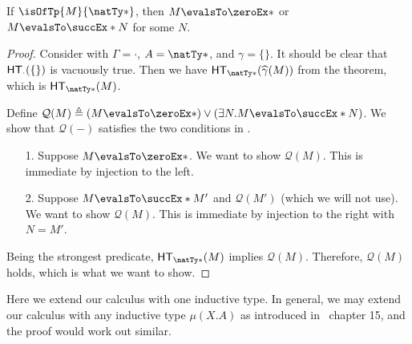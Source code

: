 \documentclass[letterpaper]{article}
\begin{document}
\begin{corollary}
  If $\isOfTp{M}{\natTy*}$, then $M \evalsTo \zeroEx*$ or $M \evalsTo \succEx*{N}$ for some $N$.
\end{corollary}
\begin{proof}
  Consider  with $\Gamma = \cdot$, $A = \natTy*$, and $\gamma = \{\}$. It should be clear that $\HT[\cdot](\{\})$ is vacuously true. Then we have $\HT[\natTy*](\widehat{\gamma}(M))$ from the theorem, which is $\HT[\natTy*](M)$.

  Define $\mathcal{Q}(M) \triangleq (M \evalsTo \zeroEx*) \lor (\exists N. M \evalsTo \succEx*{N})$. We show that $\mathcal{Q}(-)$ satisfies the two conditions in .
  \begin{enumerate}
    \item [1.] Suppose $M \evalsTo \zeroEx*$. We want to show $\mathcal{Q}(M)$. This is immediate by injection to the left.
    \item [2.] Suppose $M \evalsTo \succEx*{M'}$ and $\mathcal{Q}(M')$ (which we will not use). We want to show $\mathcal{Q}(M)$. This is immediate by injection to the right with $N = M'$.
  \end{enumerate}
  Being the strongest predicate, $\HT[\natTy*](M)$ implies $\mathcal{Q}(M)$. Therefore, $\mathcal{Q}(M)$ holds, which is what we want to show.
\end{proof}

\begin{remark}
  Here we extend our calculus with one inductive type. In general, we may extend our calculus with any inductive type $\mu(X. A)$ as introduced in \PFPL\ chapter 15, and the proof would work out similar.
\end{remark}
\end{document}
